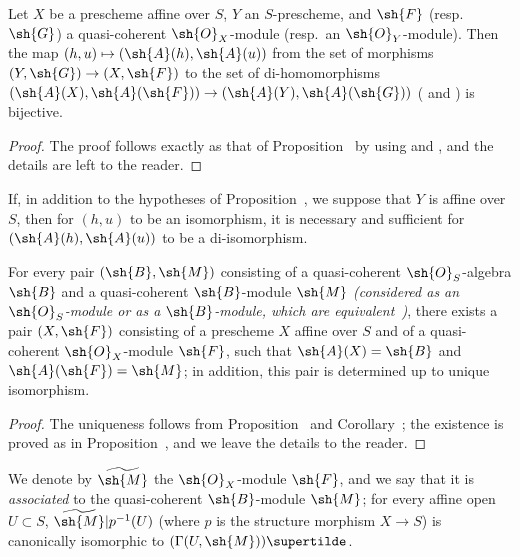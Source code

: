\begin{proposition}[1.4.1]
\label{II.1.4.1}
Let $X$ be a prescheme affine over $S$, $Y$ an $S$-prescheme, and $\sh{F}$ (resp.~$\sh{G}$) a quasi-coherent $\sh{O}_X$-module (resp.~an $\sh{O}_Y$-module).
Then the map $(h,u)\mapsto(\sh{A}(h),\sh{A}(u))$ from the set of morphisms $(Y,\sh{G})\to(X,\sh{F})$ to the set of di-homomorphisms $(\sh{A}(X),\sh{A}(\sh{F}))\to(\sh{A}(Y),\sh{A}(\sh{G}))$ ( and ) is bijective.
\end{proposition}

\begin{proof}
The proof follows exactly as that of Proposition~ by using  and , and the details are left to the reader.
\end{proof}

\begin{corollary}[1.4.2]
\label{II.1.4.2}
If, in addition to the hypotheses of Proposition~, we suppose that $Y$ is affine over $S$, then for $(h,u)$ to be an isomorphism, it is necessary and sufficient for $(\sh{A}(h),\sh{A}(u))$ to be a di-isomorphism.
\end{corollary}

\begin{proposition}[1.4.3]
\label{II.1.4.3}
For every pair $(\sh{B},\sh{M})$ consisting of a quasi-coherent $\sh{O}_S$-algebra $\sh{B}$ and a quasi-coherent $\sh{B}$-module $\sh{M}$ \emph{(considered as an $\sh{O}_S$-module or as a $\sh{B}$-module, which are equivalent~)}, there exists a pair $(X,\sh{F})$ consisting of a prescheme $X$ affine over $S$ and of a quasi-coherent $\sh{O}_X$-module $\sh{F}$, such that $\sh{A}(X)=\sh{B}$ and $\sh{A}(\sh{F})=\sh{M}$; in addition, this pair is determined up to unique isomorphism.
\end{proposition}

\begin{proof}
The uniqueness follows from Proposition~ and Corollary~; the existence is proved as in Proposition~, and we leave the details to the reader.
\end{proof}

We denote by $\widetilde{\sh{M}}$ the $\sh{O}_X$-module $\sh{F}$, and we say that it is \emph{associated} to the quasi-coherent $\sh{B}$-module $\sh{M}$; for every affine open $U\subset S$, $\widetilde{\sh{M}}|p^{-1}(U)$ (where $p$ is the structure morphism $X\to S$) is canonically isomorphic to $(\Gamma(U,\sh{M}))\supertilde$.

